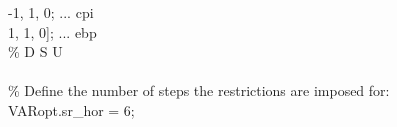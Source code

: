 \hspace{1mm}\hspace{5mm} \hspace{5mm} \hspace{5mm} \hspace{5mm} \hspace{5mm} \hspace{5mm} -1,       1,      0;        ... cpi \\ 
\hspace{1mm}\hspace{5mm} \hspace{5mm} \hspace{5mm} \hspace{5mm} \hspace{5mm} \hspace{5mm} 1,       1,      0];       ... ebp \\ 
\hspace{1mm}\hspace{5mm} \hspace{5mm} \hspace{5mm} \hspace{5mm} \hspace{5mm} \hspace{5mm} \textcolor{matlabgreen}{\% D        S       U    }\\ 
\hspace{1mm}\hspace{5mm} \hspace{5mm} \hspace{5mm} \hspace{5mm} \hspace{5mm} \hspace{5mm}  \\ 
\hspace{1mm}\hspace{5mm} \hspace{5mm} \hspace{5mm} \hspace{5mm} \hspace{5mm} \hspace{5mm} \textcolor{matlabgreen}{\% Define the number of steps the restrictions are imposed for: }\\ 
\hspace{1mm}\hspace{5mm} \hspace{5mm} \hspace{5mm} \hspace{5mm} \hspace{5mm} \hspace{5mm} VARopt.sr\_hor = 6; \\ 
